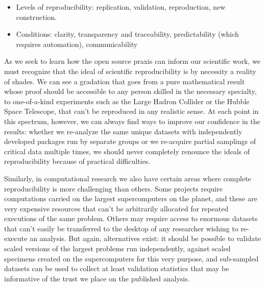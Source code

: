 \documentclass[ChapterTOCs,krantz2]{krantz} %
\begin{document}
\begin{itemize}
\item Levels of reproducibility: replication, validation, reproduction,
new construction.
\item Conditions: clarity, transparency and traceability, predictability
(which requires automation), communicability
\end{itemize}

As we seek to learn how the open source praxis can inform our scientific
work, we must recognize that the ideal of scientific reproducibility
is by necessity a reality of shades. We can see a gradation that goes
from a pure mathematical result whose proof should be accessible to
any person skilled in the necessary specialty, to one-of-a-kind experiments
such as the Large Hadron Collider or the Hubble Space Telescope, that
can't be reproduced in any realistic sense. At each point in this
spectrum, however, we can always find ways to improve our confidence
in the results: whether we re-analyze the same unique datasets with
independently developed packages run by separate groups or we re-acquire
partial samplings of critical data multiple times, we should never
completely renounce the ideals of reproducibility because of practical
difficulties.

Similarly, in computational research we also have certain areas where
complete reproducibility is more challenging than others. Some projects
require computations carried on the largest supercomputers on the
planet, and these are very expensive resources that can't be arbitrarily
allocated for repeated executions of the same problem. Others may
require access to enormous datasets that can't easily be transferred
to the desktop of any researcher wishing to re-execute an analysis.
But again, alternatives exist: it should be possible to validate scaled
versions of the largest problems run independently, against scaled
specimens created on the supercomputers for this very purpose, and
sub-sampled datasets can be used to collect at least validation statistics
that may be informative of the trust we place on the published analysis.

\end{document}
